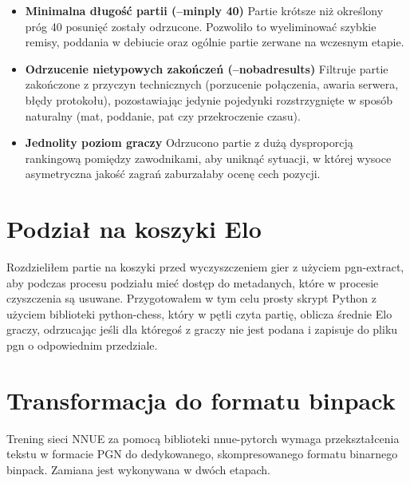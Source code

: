 \documentclass[12pt,a4paper]{report}
\begin{document}

\begin{itemize}
    \item \textbf{Minimalna długość partii (--minply 40)} Partie krótsze niż określony próg 40 posunięć zostały odrzucone. Pozwoliło to wyeliminować szybkie remisy, poddania w debiucie oraz ogólnie partie zerwane na wczesnym etapie.
    \item \textbf{Odrzucenie nietypowych zakończeń (--nobadresults)} Filtruje partie zakończone z przyczyn technicznych (porzucenie połączenia, awaria serwera, błędy protokołu), pozostawiając jedynie pojedynki rozstrzygnięte w sposób naturalny (mat, poddanie, pat czy przekroczenie czasu).
    \item \textbf{Jednolity poziom graczy} Odrzucono partie z dużą dysproporcją rankingową pomiędzy zawodnikami, aby uniknąć sytuacji, w której wysoce asymetryczna jakość zagrań zaburzałaby ocenę cech pozycji.
\end{itemize}


\section{Podział na koszyki Elo}

Rozdzieliłem partie na koszyki przed wyczyszczeniem gier z użyciem pgn-extract, aby podczas procesu podziału mieć dostęp do metadanych, które w procesie czyszczenia są usuwane. Przygotowałem w tym celu prosty skrypt Python z użyciem biblioteki python-chess, który w pętli czyta partię, oblicza średnie Elo graczy, odrzucając jeśli dla któregoś z graczy nie jest podana i zapisuje do pliku pgn o odpowiednim przedziale.

\section{Transformacja do formatu binpack}

Trening sieci NNUE za pomocą biblioteki nnue-pytorch wymaga przekształcenia tekstu w formacie PGN do dedykowanego, skompresowanego formatu binarnego binpack. Zamiana jest wykonywana w dwóch etapach.
\end{document}
